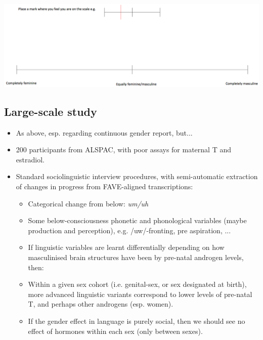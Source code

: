 \documentclass[a0,portrait]{a0poster}
\begin{document}
\begin{multicols}{2}
\begin{multicols}{2}
\begin{center}
  \includegraphics[width=1\linewidth]{scale.png}
  \end{center}
  
\end{multicols}
\subsection*{Large-scale study}


\begin{itemize}
	\item As above, esp. regarding continuous gender report, but...
	\item 200 participants from ALSPAC, with poor assays for maternal T and estradiol. 
	\item Standard sociolinguistic interview procedures, with semi-automatic extraction of changes in progress from FAVE-aligned transcriptions:
	\begin{itemize}
		\item Categorical change from below: \textsl{um/uh}
		\item Some below-consciousness phonetic and phonological variables (maybe production and perception), e.g. /uw/-fronting, pre aspiration, ...
	\end{itemize}
	\begin{center}
\begin{itemize}
\item If linguistic variables are learnt differentially depending on how masculinised brain structures have been by pre-natal androgen levels, then:
\end{itemize}
\end{center} 
\begin{itemize}
	\item Within a given sex cohort (i.e. genital-sex, or sex designated at birth), more advanced linguistic variants correspond to lower levels of pre-natal T, and perhaps other androgens (esp. women).
	\item If the gender effect in language is purely social, then we should see no effect of hormones within each sex (only between sexes).
\end{itemize}
\end{itemize}


\end{multicols}
\end{document}
